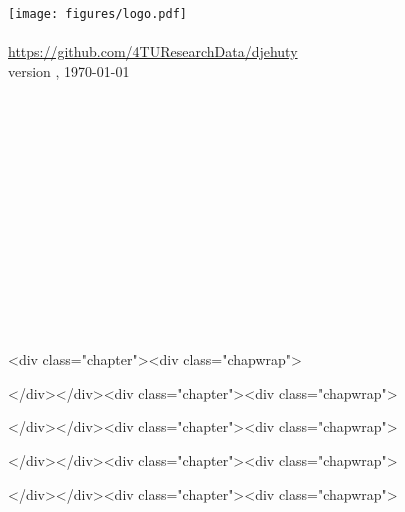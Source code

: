 \documentclass[12pt,a4paper]{book}
\begin{document}
{{\begin{titlepage}
\begin{center}
      \texttt{[image: figures/logo.pdf]}
      ~\\~\\
      \url{https://github.com/4TUResearchData/djehuty}~\\
       version \djehutyversion{}, \today{}
       ~\\~\\~\\~\\~\\~\\~\\~\\~\\~\\~\\~\\~\\~\\
       \vspace*{\fill}
    \fi
  \end{center}
  \thispagestyle{empty}
\end{titlepage}

\setcounter{page}{1}
\hypersetup{linkcolor=black}

\ifdefined\HCode
\begin{html}
<div class="chapter"><div class="chapwrap">
\end{html}
\fi

\tableofcontents

\ifdefined\HCode
\begin{html}
</div></div><div class="chapter"><div class="chapwrap">
\end{html}
\fi

\listoffigures
\newpage{}
\hypersetup{linkcolor=LinkGray}
\setcounter{page}{1}

\ifdefined\HCode
\begin{html}
</div></div><div class="chapter"><div class="chapwrap">
\end{html}
\fi



\ifdefined\HCode
\begin{html}
</div></div><div class="chapter"><div class="chapwrap">
\end{html}
\fi



\ifdefined\HCode
\begin{html}
</div></div><div class="chapter"><div class="chapwrap">
\end{html}
\fi

}}
\end{document}

